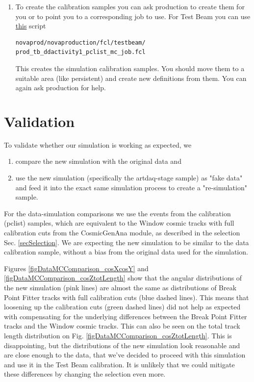 \documentclass[12pt]{article}
\begin{document}
\begin{enumerate}
\item To create the calibration samples you can ask production to create them for you or to point you to a corresponding job to use. For Test Beam you can use \href{https://github.com/novaexperiment/novaprod/blob/main/novaproduction/fcl/testbeam/prod\_tb\_ddactivity1\_pclist\_mc\_job.fcl}{this} script
\begin{lstlisting}[frame=single,language=bash]
novaprod/novaproduction/fcl/testbeam/
prod_tb_ddactivity1_pclist_mc_job.fcl
\end{lstlisting}
This creates the simulation calibration samples. You should move them to a suitable area (like persistent) and create new definitions from them. You can again ask production for help.
\end{enumerate}

\section{Validation}
To validate whether our simulation is working as expected, we
\begin{enumerate}
\item compare the new simulation with the original data and
\item use the new simulation (specifically the artdaq-stage sample) as "fake data" and feed it into the exact same simulation process to create a "re-simulation" sample.
\end{enumerate}

For the data-simulation comparisons we use the events from the calibration (pclist) samples, which are equivalent to the Window cosmic tracks with full calibration cuts from the CosmicGenAna module, as described in the selection Sec. \ref{secSelection}. We are expecting the new simulation to be similar to the data calibration sample, without a bias from the original data used for the simulation.

Figures \ref{figDataMCComparison_cosXcosY} and \ref{figDataMCComparison_cosZtotLength} show that the angular distributions of the new simulation (pink lines) are almost the same as distributions of Break Point Fitter tracks with full calibration cuts (blue dashed lines). This means that loosening up the calibration cuts (green dashed lines) did not help as expected with compensating for the underlying differences between the Break Point Fitter tracks and the Window cosmic tracks. This can also be seen on the total track length distribution on Fig. \ref{figDataMCComparison_cosZtotLength}. This is disappointing, but the distributions of the new simulation look reasonable and are close enough to the data, that we've decided to proceed with this simulation and use it in the Test Beam calibration. It is unlikely that we could mitigate these differences by changing the selection even more.
\end{document}

